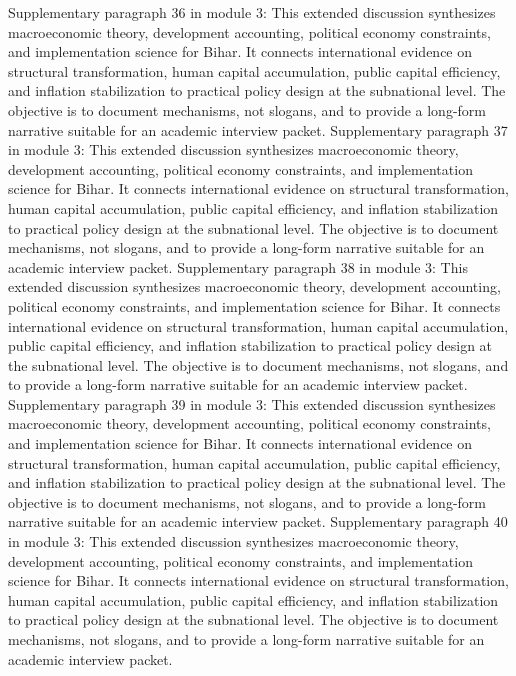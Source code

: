 \documentclass[preprint,12pt]{elsarticle}
\begin{document}
Supplementary paragraph 36 in module 3: This extended discussion synthesizes macroeconomic theory, development accounting, political economy constraints, and implementation science for Bihar. It connects international evidence on structural transformation, human capital accumulation, public capital efficiency, and inflation stabilization to practical policy design at the subnational level. The objective is to document mechanisms, not slogans, and to provide a long-form narrative suitable for an academic interview packet.
Supplementary paragraph 37 in module 3: This extended discussion synthesizes macroeconomic theory, development accounting, political economy constraints, and implementation science for Bihar. It connects international evidence on structural transformation, human capital accumulation, public capital efficiency, and inflation stabilization to practical policy design at the subnational level. The objective is to document mechanisms, not slogans, and to provide a long-form narrative suitable for an academic interview packet.
Supplementary paragraph 38 in module 3: This extended discussion synthesizes macroeconomic theory, development accounting, political economy constraints, and implementation science for Bihar. It connects international evidence on structural transformation, human capital accumulation, public capital efficiency, and inflation stabilization to practical policy design at the subnational level. The objective is to document mechanisms, not slogans, and to provide a long-form narrative suitable for an academic interview packet.
Supplementary paragraph 39 in module 3: This extended discussion synthesizes macroeconomic theory, development accounting, political economy constraints, and implementation science for Bihar. It connects international evidence on structural transformation, human capital accumulation, public capital efficiency, and inflation stabilization to practical policy design at the subnational level. The objective is to document mechanisms, not slogans, and to provide a long-form narrative suitable for an academic interview packet.
Supplementary paragraph 40 in module 3: This extended discussion synthesizes macroeconomic theory, development accounting, political economy constraints, and implementation science for Bihar. It connects international evidence on structural transformation, human capital accumulation, public capital efficiency, and inflation stabilization to practical policy design at the subnational level. The objective is to document mechanisms, not slogans, and to provide a long-form narrative suitable for an academic interview packet.
\end{document}
